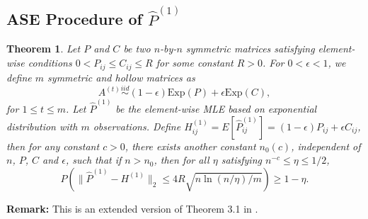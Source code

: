 \documentclass[a4paper]{article}
\newtheorem{theorem}[fact]{Theorem}
\renewcommand{\hat}{\widehat}
\begin{document}
\subsection{ASE Procedure of $\hat{P}^{(1)}$}
\label{section:pf_MLEvsMLEASE1}

\begin{theorem}%
\label{thm:P1Diff}
Let $P$ and $C$ be two $n$-by-$n$ symmetric matrices satisfying element-wise conditions $0 < P_{ij} \le C_{ij} \le R$ for some constant $R > 0$. For $0 < \epsilon < 1$, we define $m$ symmetric and hollow matrices as
\[
	A^{(t)} \stackrel{iid}{\sim} (1-\epsilon) \mathrm{Exp}(P) + \epsilon \mathrm{Exp}(C),
\]
for $1 \le t \le m$.
Let $\hat{P}^{(1)}$ be the element-wise MLE based on exponential distribution with $m$ observations.
Define $H_{ij}^{(1)} = E[\hat{P}_{ij}^{(1)}] = (1-\epsilon) P_{ij} + \epsilon C_{ij}$,
then for any constant $c > 0$, there exists another constant $n_0(c)$, independent of $n$, $P$, $C$ and $\epsilon$, such that if $n > n_0$, then for all $\eta$ satisfying $n^{-c} \le \eta \le 1/2$,
\[
	P \left( \| \hat{P}^{(1)} - H^{(1)} \|_2 \le 4 R \sqrt{n \ln(n/\eta)/m}\right) \ge 1 - \eta.
\]
\end{theorem}
\textbf{Remark:} This is an extended version of Theorem 3.1 in \citep{oliveira2009concentration}. \\
\end{document}
